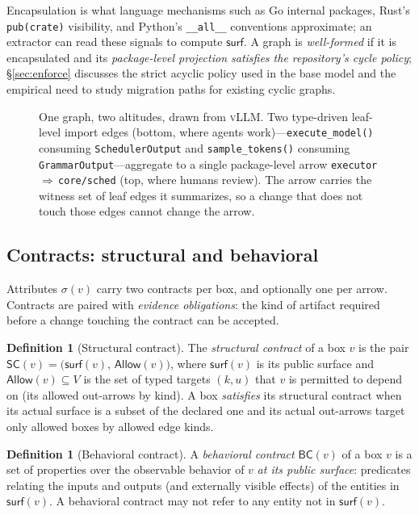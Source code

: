 \documentclass[sigconf,review,anonymous]{acmart}
\theoremstyle{plain}
\theoremstyle{definition}
\newtheorem{definition}[theorem]{Definition}
\begin{document}
Encapsulation is what language mechanisms such as Go internal packages, Rust's
\texttt{pub(crate)} visibility, and Python's \texttt{\_\_all\_\_} conventions
approximate; an extractor can read these signals to compute
$\mathsf{surf}$. A graph is \emph{well-formed} if it is encapsulated and its
\emph{package-level projection satisfies the repository's cycle policy};
\S\ref{sec:enforce} discusses the strict acyclic policy used in the base model
and the empirical need to study migration paths for existing cyclic graphs.

\begin{figure}[t]
\centering

\caption{One graph, two altitudes, drawn from \textsc{vLLM}. Two type-driven
leaf-level import edges (bottom, where agents work)---\texttt{execute\_model()}
consuming \texttt{SchedulerOutput} and \texttt{sample\_tokens()} consuming
\texttt{GrammarOutput}---aggregate to a single package-level arrow
\texttt{executor}\,$\Rightarrow$\,\texttt{core/sched} (top, where humans review).
The arrow carries the witness set of leaf edges it summarizes, so a change that
does not touch those edges cannot change the arrow.}
\label{fig:aggregation}
\end{figure}

\subsection{Contracts: structural and behavioral}\label{sec:contracts}

Attributes $\sigma(v)$ carry two contracts per box, and optionally one per
arrow. Contracts are paired with \emph{evidence obligations}: the kind of
artifact required before a change touching the contract can be accepted.

\begin{definition}[Structural contract]
The \emph{structural contract} of a box $v$ is the pair
$\mathsf{SC}(v)=\big(\mathsf{surf}(v),\,\mathsf{Allow}(v)\big)$, where
$\mathsf{surf}(v)$ is its public surface and $\mathsf{Allow}(v)\subseteq V$ is
the set of typed targets $(k,u)$ that $v$ is permitted to depend on (its
allowed out-arrows by kind). A box \emph{satisfies} its structural contract when
its actual surface is a subset of the declared one and its actual out-arrows
target only allowed boxes by allowed edge kinds.
\end{definition}

\begin{definition}[Behavioral contract]\label{def:bc}
A \emph{behavioral contract} $\mathsf{BC}(v)$ of a box $v$ is a set of
properties over the observable behavior of $v$ \emph{at its public surface}:
predicates relating the inputs and outputs (and externally visible effects) of
the entities in $\mathsf{surf}(v)$. A behavioral contract may not refer to any
entity not in $\mathsf{surf}(v)$.
\end{definition}
\end{document}
